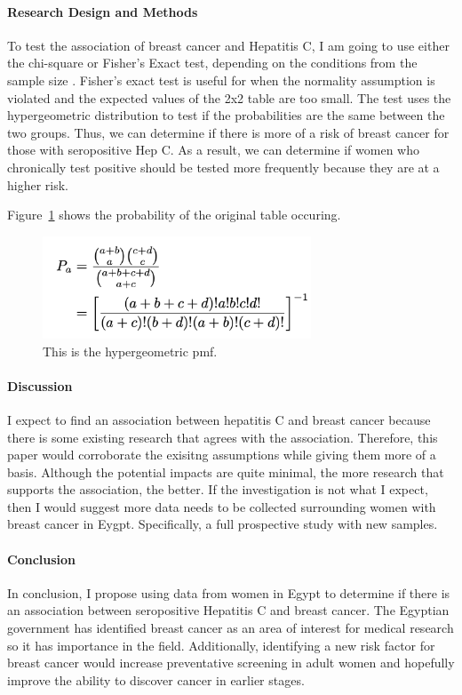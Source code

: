 \documentclass[12pt, titlepage]{article}
\begin{document}
\paragraph{Research Design and Methods}

To test the association of breast cancer and Hepatitis C, I am going to use either the chi-square or Fisher's Exact test, depending on the
conditions from the sample size \citep{warner2013testing}. Fisher's exact test is useful for when the normality assumption is violated 
and the expected values of the 2x2 table are too small. The test uses the hypergeometric distribution to test if the probabilities are
the same between the two groups. Thus, we can determine if there is more of a risk of breast cancer for those with seropositive Hep C. As
 a result, we can determine if women who chronically test positive should be tested more frequently because they are at a higher risk. 
 
Figure~\ref{fig:formula} shows the probability of the original table occuring.

\begin{figure}[tbp]
  \centering
  \includegraphics[width=8cm]{formula.png}
  \caption{This is the hypergeometric pmf.}
  \label{fig:formula}
\end{figure}


\paragraph{Discussion}

I expect to find an association between hepatitis C and breast cancer because there is some existing research that agrees with the association.
Therefore, this paper would corroborate the exisitng assumptions while giving them more of a basis. Although the potential impacts are quite 
minimal, the more research that supports the association, the better. If the investigation is not what I expect, then I would suggest more
data needs to be collected surrounding women with breast cancer in Eygpt. Specifically, a full prospective study with new samples. 

\paragraph{Conclusion}

In conclusion, I propose using data from women in Egypt to determine if there is an association between seropositive Hepatitis C and 
breast cancer. The Egyptian government has identified breast cancer as an area of interest for medical research so it has importance in
the field. Additionally, identifying a new risk factor for breast cancer would increase preventative screening in adult women and hopefully 
improve the ability to discover cancer in earlier stages. 




\end{document}
